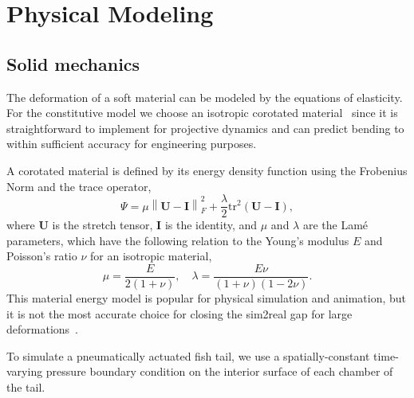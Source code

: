 \section{Physical Modeling}
\label{physical_modeling}

\subsection{Solid mechanics}
\label{solid_mechanics}
The deformation of a soft material can be modeled by the equations of elasticity. For the constitutive model we choose an isotropic corotated material~\cite{sifakis2012fem} since it is straightforward to implement for projective dynamics and can predict bending to within sufficient accuracy for engineering purposes.

A corotated material is defined by its energy density function using the Frobenius Norm and the trace operator,
\begin{equation}
    \Psi = \mu \left\lVert\mathbf{U} - \mathbf{I}\right\rVert^2_F + \frac{\lambda}{2}\text{tr}^2(\mathbf{U}-\mathbf{I}),
\end{equation}
where $\mathbf{U}$ is the stretch tensor, $\mathbf{I}$ is the identity, and $\mu$ and $\lambda$ are the Lam\'e parameters, which have the following relation to the Young's modulus $E$ and Poisson's ratio $\nu$ for an isotropic material,
\begin{equation}
    \mu = \frac{E}{2(1+\nu)}, \quad \lambda = \frac{E\nu}{(1+\nu)(1-2\nu)}.
\end{equation} This material energy model is popular for physical simulation and animation, but it is not the most accurate choice for closing the sim2real gap for large deformations~\cite{sifakis2012fem, adeeb2011introduction}. 

To simulate a pneumatically actuated fish tail, we use a spatially-constant time-varying pressure boundary condition on the interior surface of each chamber of the tail.

